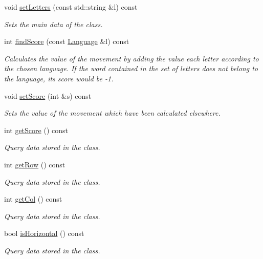 \begin{DoxyCompactItemize}
void \hyperlink{classMove_ac9141b7ec4d5dd5933c3239c9132423b}{set\+Letters} (const std\+::string \&l) const
\begin{DoxyCompactList}\small\item\em Sets the main data of the class. \end{DoxyCompactList}\item 
int \hyperlink{classMove_aa6b05aeb84f41524a7da5e700d5d3bc6}{find\+Score} (const \hyperlink{classLanguage}{Language} \&l) const
\begin{DoxyCompactList}\small\item\em Calculates the value of the movement by adding the value each letter according to the chosen language. If the word contained in the set of letters does not belong to the language, its score would be -\/1. \end{DoxyCompactList}\item 
void \hyperlink{classMove_a21b314522e08b27c13c394ae5b14da48}{set\+Score} (int \&s) const
\begin{DoxyCompactList}\small\item\em Sets the value of the movement which have been calculated elsewhere. \end{DoxyCompactList}\item 
int \hyperlink{classMove_a5c6f95db47cfd83c5f6c039cfb5b9c2d}{get\+Score} () const
\begin{DoxyCompactList}\small\item\em Query data stored in the class. \end{DoxyCompactList}\item 
int \hyperlink{classMove_aa8fcb5e4f786cbf46452ae6cc8b2854a}{get\+Row} () const
\begin{DoxyCompactList}\small\item\em Query data stored in the class. \end{DoxyCompactList}\item 
int \hyperlink{classMove_aff2eaae186d0524aa616fe88ad844722}{get\+Col} () const
\begin{DoxyCompactList}\small\item\em Query data stored in the class. \end{DoxyCompactList}\item 
bool \hyperlink{classMove_a4092ef4f8137323616b470104704ad27}{is\+Horizontal} () const
\begin{DoxyCompactList}\small\item\em Query data stored in the class. \end{DoxyCompactList}\item 

\end{DoxyCompactItemize}

